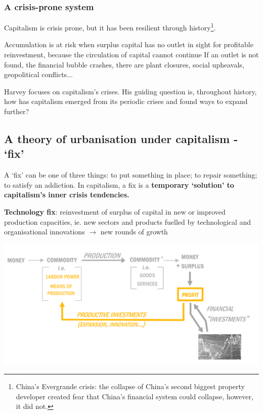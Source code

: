 \documentclass{article}
\begin{document}
\subsubsection{A crisis-prone system}

Capitalism is crisis prone, but it has been resilient through history\footnote{China's Evergrande crisis: the collapse of China's second biggest property developer created fear that China's financial system could collapse, however, it did not.}. 

\begin{outline}
	\1 Accumulation is at risk when surplus capital has no outlet in sight for profitable reinvestment, because the circulation of capital cannot continue
	\1 If an outlet is not found, the financial bubble crashes, there are plant closures, social upheavals, geopolitical conflicts...
\end{outline}

Harvey focuses on capitalism's crises. His guiding question is, throughout history, how has capitalism emerged from its periodic crises and found ways to expand further?

\subsection{A theory of urbanisation under capitalism - `fix'}

A `fix' can be one of three things: to put something in place; to repair something; to satisfy an addiction. In capitalism, a fix is a \textbf{temporary `solution' to capitalism's inner crisis tendencies.}

\textbf{Technology fix}: reinvestment of surplus of capital in new or improved production capacities, ie. new sectors and products fuelled by technological and organisational innovations $\rightarrow$ new rounds of growth

\includegraphics[width=\textwidth]{technological_fix}
\end{document}
